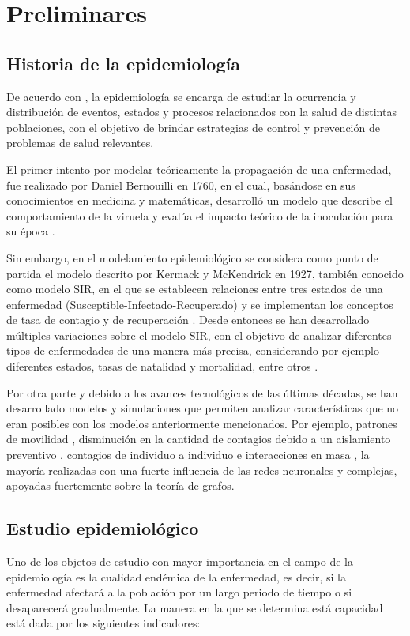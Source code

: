 \chapter{Preliminares}\label{ch:Preliminares}
\section{Historia de la epidemiología}\label{sec:Historia de la epidemiología}
De acuerdo con \cite{epiDictionary}, la epidemiología se encarga de estudiar la ocurrencia y distribución de eventos, estados y procesos relacionados con la salud de distintas poblaciones, con el objetivo de brindar estrategias de control y prevención de problemas de salud relevantes.

El primer intento por modelar teóricamente la propagación de una enfermedad, fue realizado por Daniel Bernouilli en 1760, en el cual, basándose en sus conocimientos en medicina y matemáticas, desarrolló un modelo que describe el comportamiento de la viruela y evalúa el impacto teórico de la inoculación para su época \cite{shortHistory}. 

Sin embargo, en el modelamiento epidemiológico se considera como punto de partida el modelo descrito por Kermack y McKendrick en 1927, también conocido como modelo SIR, en el que se establecen relaciones entre tres estados de una enfermedad (Susceptible-Infectado-Recuperado) y se implementan los conceptos de tasa de contagio y de recuperación \cite{malariaSIR}. Desde entonces se han desarrollado múltiples variaciones sobre el modelo SIR, con el objetivo de analizar diferentes tipos de enfermedades de una manera más precisa, considerando por ejemplo diferentes estados, tasas de natalidad y mortalidad, entre otros \cite{diego2010}.

Por otra parte y debido a los avances tecnológicos de las últimas décadas, se han desarrollado modelos y simulaciones que permiten analizar características que no eran posibles con los modelos anteriormente mencionados. Por ejemplo, patrones de movilidad \cite{colaGNN, epidemiologicalNeuralNetwork}, disminución en la cantidad de contagios debido a un aislamiento preventivo \cite{stayHome}, contagios de individuo a individuo \cite{heterogeneousPopulation} e interacciones en masa \cite{combiningGraph, transfer2021}, la mayoría realizadas con una fuerte influencia de las redes neuronales y complejas, apoyadas fuertemente sobre la teoría de grafos.

\section{Estudio epidemiológico}\label{sec:Estudio epidemiológico}
Uno de los objetos de estudio con mayor importancia en el campo de la epidemiología es la cualidad endémica de la enfermedad, es decir, si la enfermedad afectará a la población por un largo periodo de tiempo o si desaparecerá gradualmente. La manera en la que se determina está capacidad está dada por los siguientes indicadores:

